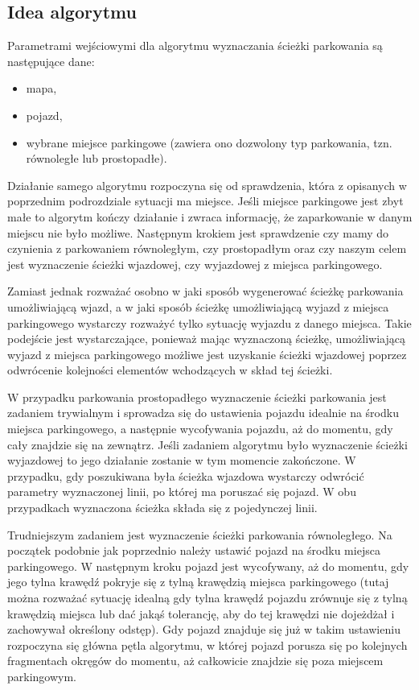\documentclass[a4paper,11pt,twoside]{report}
\theoremstyle{definition}
\begin{document}
\subsection{Idea algorytmu}

Parametrami wejściowymi dla algorytmu wyznaczania ścieżki parkowania są następujące dane:
\begin{itemize}
	\item mapa,
	\item pojazd,
	\item wybrane miejsce parkingowe (zawiera ono dozwolony typ parkowania, tzn. równoległe lub prostopadłe).
\end{itemize}

Działanie samego algorytmu rozpoczyna się od sprawdzenia, która z opisanych w poprzednim podrozdziale sytuacji ma miejsce. Jeśli miejsce parkingowe jest zbyt małe to algorytm kończy działanie i zwraca informację, że zaparkowanie w danym miejscu nie było możliwe. Następnym krokiem jest sprawdzenie czy mamy do czynienia z parkowaniem równoległym, czy prostopadłym oraz czy naszym celem jest wyznaczenie ścieżki wjazdowej, czy wyjazdowej z miejsca parkingowego.

Zamiast jednak rozważać osobno w jaki sposób wygenerować ścieżkę parkowania umożliwiającą wjazd, a w jaki sposób ścieżkę umożliwiającą wyjazd z miejsca parkingowego wystarczy rozważyć tylko sytuację wyjazdu z danego miejsca. Takie podejście jest wystarczające, ponieważ mając wyznaczoną ścieżkę, umożliwiającą wyjazd z miejsca parkingowego możliwe jest uzyskanie ścieżki wjazdowej poprzez odwrócenie kolejności elementów wchodzących w skład tej ścieżki.

W przypadku parkowania prostopadłego wyznaczenie ścieżki parkowania jest zadaniem trywialnym i sprowadza się do ustawienia pojazdu idealnie na środku miejsca parkingowego, a następnie wycofywania pojazdu, aż do momentu, gdy cały znajdzie się na zewnątrz. Jeśli zadaniem algorytmu było wyznaczenie ścieżki wyjazdowej to jego działanie zostanie w tym momencie zakończone. W przypadku, gdy poszukiwana była ścieżka wjazdowa wystarczy odwrócić parametry wyznaczonej linii, po której ma poruszać się pojazd.  W obu przypadkach wyznaczona ścieżka składa się z pojedynczej linii.

Trudniejszym zadaniem jest wyznaczenie ścieżki parkowania równoległego. Na początek podobnie jak poprzednio należy ustawić pojazd na środku miejsca parkingowego. W następnym kroku pojazd jest wycofywany, aż do momentu, gdy jego tylna krawędź pokryje się z tylną krawędzią miejsca parkingowego (tutaj można rozważać sytuację idealną gdy tylna krawędź pojazdu zrównuje się z tylną krawędzią miejsca lub dać jakąś tolerancję, aby do tej krawędzi nie dojeżdżał i zachowywał określony odstęp). Gdy pojazd znajduje się już w takim ustawieniu rozpoczyna się główna pętla algorytmu, w której pojazd porusza się po kolejnych fragmentach okręgów do momentu, aż całkowicie znajdzie się poza miejscem parkingowym. 
\end{document}
